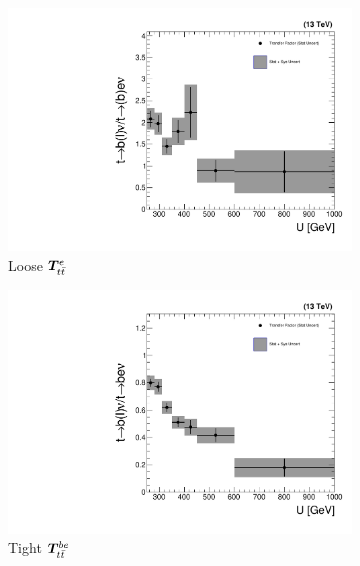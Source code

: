 \begin{figure}[]
\begin{center}
\begin{subfigure}[t]{0.32\textwidth}
            \includegraphics[width=\textwidth]{figures/monotop/xfer/rfactor_singleelectronwtop_loose.pdf}
            \caption{Loose $\bm{T}^{e}_{t\bar{t}}$}
        \end{subfigure}
        \begin{subfigure}[t]{0.32\textwidth}
            \includegraphics[width=\textwidth]{figures/monotop/xfer/rfactor_singleelectrontop.pdf}
            \caption{Tight $\bm{T}^{be}_{t\bar{t}}$}
        \end{subfigure}
        \begin{subfigure}[t]{0.32\textwidth}

\end{subfigure}
\end{center}
\end{figure}
